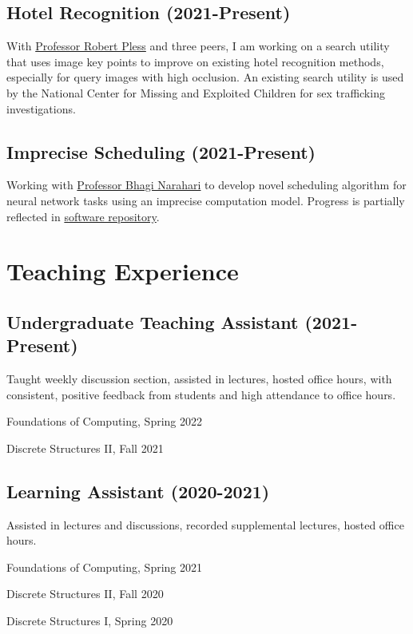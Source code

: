 \documentclass[letterpaper]{article}
\renewenvironment{itemize}{
  \begin{list}{}{
    \setlength{\leftmargin}{1.5em}
  }
}{
  \end{list}
}
\begin{document}
\subsection*{Hotel Recognition (2021-Present)}
With \href{https://www2.seas.gwu.edu/~pless/}{Professor Robert Pless} and three peers, I am working
on a search utility that uses image key points to improve on existing hotel recognition methods,
especially for query images with high occlusion.
An existing search utility is used by the National Center for Missing and Exploited Children
for sex trafficking investigations.

\subsection*{Imprecise Scheduling (2021-Present)}
Working with \href{https://www2.seas.gwu.edu/~narahari/}{Professor Bhagi Narahari} to 
develop novel scheduling algorithm for neural network tasks using an imprecise computation
model. Progress is partially reflected in 
\href{https://github.com/obroadrick/imprecise}{software repository}.

\section*{Teaching Experience}
\subsection*{Undergraduate Teaching Assistant (2021-Present)}
Taught weekly discussion section, assisted in lectures, hosted office hours, with consistent, positive feedback from students and high attendance to office hours.
\begin{itemize}
\item
Foundations of Computing, Spring 2022
\item
Discrete Structures II, Fall 2021
\end{itemize}
\subsection*{Learning Assistant (2020-2021)}
Assisted in lectures and discussions, recorded supplemental lectures, hosted office hours.
\begin{itemize}
\item
Foundations of Computing, Spring 2021
\item
Discrete Structures II, Fall 2020
\item
Discrete Structures I, Spring 2020
\end{itemize}
\end{document}
